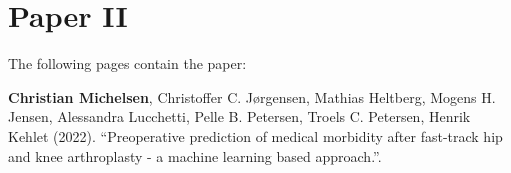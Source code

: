\chapter{Paper II}
\label{chapter:hospital}

The following pages contain the paper:
\vspace*{1cm}


\textbf{Christian Michelsen}, Christoffer C. Jørgensen, Mathias Heltberg, Mogens H. Jensen, Alessandra Lucchetti, Pelle B. Petersen, Troels C. Petersen, Henrik Kehlet (2022). ``Preoperative prediction of medical morbidity after fast-track hip and knee arthroplasty - a machine learning based approach.''.


% 
